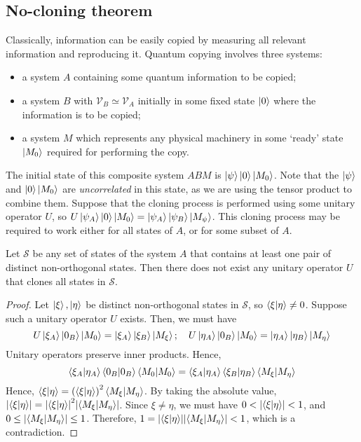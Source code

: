 \subsection{No-cloning theorem}
Classically, information can be easily copied by measuring all relevant information and reproducing it.
Quantum copying involves three systems:
\begin{itemize}
    \item a system \( A \) containing some quantum information to be copied;
    \item a system \( B \) with \( \mathcal V_B \simeq \mathcal V_A \) initially in some fixed state \( \ket{0} \) where the information is to be copied;
    \item a system \( M \) which represents any physical machinery in some `ready' state \( \ket{M_0} \) required for performing the copy.
\end{itemize}
The initial state of this composite system \( ABM \) is \( \ket{\psi} \ket{0} \ket{M_0} \).
Note that the \( \ket{\psi} \) and \( \ket{0}\ket{M_0} \) are \emph{uncorrelated} in this state, as we are using the tensor product to combine them.
Suppose that the cloning process is performed using some unitary operator \( U \), so \( U\ket{\psi_A}\ket{0}\ket{M_0} = \ket{\psi_A}\ket{\psi_B}\ket{M_\psi} \).
This cloning process may be required to work either for all states of \( A \), or for some subset of \( A \).
\begin{theorem}
    Let \( \mathcal S \) be any set of states of the system \( A \) that contains at least one pair of distinct non-orthogonal states.
    Then there does not exist any unitary operator \( U \) that clones all states in \( \mathcal S \).
\end{theorem}
\begin{proof}
    Let \( \ket{\xi}, \ket{\eta} \) be distinct non-orthogonal states in \( \mathcal S \), so \( \ip{\xi}{\eta} \neq 0 \).
    Suppose such a unitary operator \( U \) exists.
    Then, we must have
    \[ U \ket{\xi_A}\ket{0_B}\ket{M_0} = \ket{\xi_A}\ket{\xi_B}\ket{M_\xi};\quad U \ket{\eta_A}\ket{0_B}\ket{M_0} = \ket{\eta_A}\ket{\eta_B}\ket{M_\eta} \]
    Unitary operators preserve inner products.
    Hence,
    \[ \ip{\xi_A}{\eta_A} \ip{0_B}{0_B} \ip{M_0}{M_0} = \ip{\xi_A}{\eta_A} \ip{\xi_B}{\eta_B} \ip{M_\xi}{M_\eta} \]
    Hence, \( \ip{\xi}{\eta} = \qty(\ip{\xi}{\eta})^2 \ip{M_\xi}{M_\eta} \).
    By taking the absolute value, \( \abs{\ip{\xi}{\eta}} = \abs{\ip{\xi}{\eta}}^2 \abs{\ip{M_\xi}{M_\eta}} \).
    Since \( \xi \neq \eta \), we must have \( 0 < \abs{\ip{\xi}{\eta}} < 1 \), and \( 0 \leq \abs{\ip{M_\xi}{M_\eta}} \leq 1 \).
    Therefore, \( 1 = \abs{\ip{\xi}{\eta}} \abs{\ip{M_\xi}{M_\eta}} < 1 \), which is a contradiction.
\end{proof}

